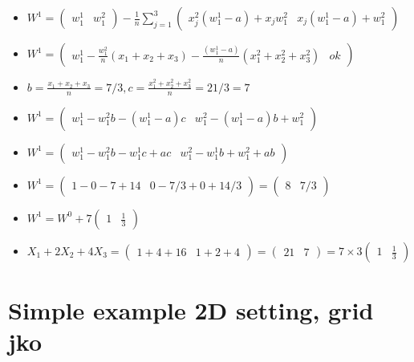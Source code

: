 \begin{itemize}
\begin{itemize}
		\item $W^1 = \begin{pmatrix} w^1_1 & w^2_1 \end{pmatrix} - \frac{1}{n}\sum_{j=1}^{3} \begin{pmatrix} x_j^2 (w^1_1 - a) + x_j w^2_1 & x_j(w^1_1 - a) + w^2_1 \end{pmatrix}   $
		\item $W^1 = \begin{pmatrix}w_1^1 -\frac{w_1^2}{n} (x_1 + x_2 + x_3) - \frac{(w_1^1 - a)}{n} (x_1^2 + x_2^2 + x_3^2)  & ok \end{pmatrix} $
		\item $b = \frac{x_1 + x_2 + x_3}{n} = 7/3, c = \frac{x^2_1 + x^2_2 + x^2_3}{n} = 21/3 = 7$ %
		\item $W^1 = \begin{pmatrix}w_1^1 -w_1^2 b - (w_1^1 - a) c  &  w^2_1 - (w_1^1 - a) b + w^2_1\end{pmatrix} $
		\item $W^1 = \begin{pmatrix}w_1^1 -w_1^2 b - w_1^1 c  + a c  &  w^2_1 - w_1^1 b + w^2_1 + a b \end{pmatrix} $
		\item $W^1 = \begin{pmatrix} 1 - 0 -7 + 14 & 0 - 7/3 + 0 + 14/3 \end{pmatrix} = \begin{pmatrix} 8 &7/3 \end{pmatrix} $
		\item $W^1 = W^0  + 7 \begin{pmatrix}  1 & \frac{1}{3}\end{pmatrix} $
		\item $X_1 + 2 X_2 + 4 X_3 = \begin{pmatrix} 1+4+16& 1+2+4 \end{pmatrix} = \begin{pmatrix} 21 & 7 \end{pmatrix} = 7 \times 3 \begin{pmatrix} 1 & \frac{1}{3} \end{pmatrix}  $
	\end{itemize}
\end{itemize}

\section{Simple example 2D setting, grid jko}

